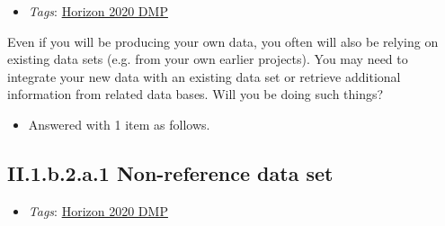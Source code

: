 \documentclass[a4paper,12pt]{report}
\begin{document}
\label{82fd0cce-2b41-423f-92ad-636d0872045c.efc80cc8-8318-4f8c-acb7-dc1c60e491c1.2663b978-5125-4224-9930-0a50dbe895c9.be872000-cb98-442f-999c-ca3ef58dcfe8}


\begin{itemize}
  \item \textit{Tags}: \ul{Horizon 2020 DMP}
  \end{itemize}


\noindent
\begin{markdown}
Even if you will be producing your own data, you often will also be relying on existing data sets (e.g. from your own earlier projects). You may need to integrate your new data with an existing data set or retrieve additional information from related data bases. Will you be doing such things?
\end{markdown}


\begin{itemize}
  \item[\ArrowBoldDownRight] Answered with 1 item as follows.
\end{itemize}%
\subsection*{\protect\textcolor{colorSecId}{II.1.b.2.a.1} Non-reference data set}

\label{82fd0cce-2b41-423f-92ad-636d0872045c.efc80cc8-8318-4f8c-acb7-dc1c60e491c1.2663b978-5125-4224-9930-0a50dbe895c9.be872000-cb98-442f-999c-ca3ef58dcfe8.c8bd43ef-4b52-48d9-be2a-7f51dad8d3c4.44120979-2840-4522-8297-df13f7fd1e3a}


\begin{itemize}
  \item \textit{Tags}: \ul{Horizon 2020 DMP}
  \end{itemize}
\end{document}
